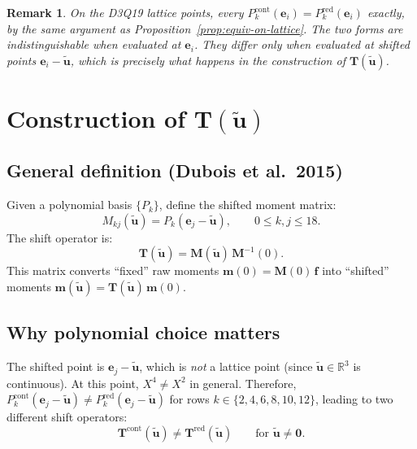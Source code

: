 \documentclass[11pt,a4paper]{article}
\newtheorem{remark}{Remark}[section]
\newcommand{\vect}[1]{\bm{#1}}
\newcommand{\mat}[1]{\bm{#1}}
\newcommand{\Tmat}{\mat{T}}
\newcommand{\Mmat}{\mat{M}}
\newcommand{\Real}{\mathbb{R}}
\begin{document}
\begin{remark}
On the D3Q19 lattice points, every $P_k^{\text{cont}}(\vect{e}_i) = P_k^{\text{red}}(\vect{e}_i)$ exactly, by the same argument as Proposition~\ref{prop:equiv-on-lattice}.
The two forms are indistinguishable when evaluated at $\vect{e}_i$.
They differ only when evaluated at shifted points $\vect{e}_i - \tilde{\vect{u}}$, which is precisely what happens in the construction of $\Tmat(\tilde{\vect{u}})$.
\end{remark}

\section{Construction of \texorpdfstring{$\Tmat(\tilde{\vect{u}})$}{T(u)}}\label{sec:construction}

\subsection{General definition (Dubois et al.\ 2015)}

Given a polynomial basis $\{P_k\}$, define the shifted moment matrix:
\begin{equation}\label{eq:M-shifted}
  M_{kj}(\tilde{\vect{u}}) = P_k(\vect{e}_j - \tilde{\vect{u}}), \qquad 0 \leq k,j \leq 18.
\end{equation}
The shift operator is:
\begin{equation}\label{eq:T-general}
  \Tmat(\tilde{\vect{u}}) = \Mmat(\tilde{\vect{u}})\,\Mmat^{-1}(0).
\end{equation}
This matrix converts ``fixed'' raw moments $\vect{m}(0) = \Mmat(0)\,\vect{f}$ into ``shifted'' moments $\vect{m}(\tilde{\vect{u}}) = \Tmat(\tilde{\vect{u}})\,\vect{m}(0)$.

\subsection{Why polynomial choice matters}

The shifted point is $\vect{e}_j - \tilde{\vect{u}}$, which is \emph{not} a lattice point (since $\tilde{\vect{u}} \in \Real^3$ is continuous).
At this point, $X^4 \neq X^2$ in general.
Therefore, $P_k^{\text{cont}}(\vect{e}_j - \tilde{\vect{u}}) \neq P_k^{\text{red}}(\vect{e}_j - \tilde{\vect{u}})$ for rows $k \in \{2,4,6,8,10,12\}$, leading to two different shift operators:
\begin{equation}
  \Tmat^{\text{cont}}(\tilde{\vect{u}}) \neq \Tmat^{\text{red}}(\tilde{\vect{u}}) \qquad \text{for } \tilde{\vect{u}} \neq \vect{0}.
\end{equation}
\end{document}

